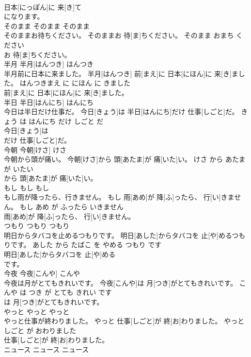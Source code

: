 \documentclass[8pt]{extreport}
\begin{document}
\begin{CJK}{UTF8}{min}
\\	日本[にっぽん]に 来[き]て
\\	になります。			
\\	そのまま	そのまま	そのまま	
\\	そのままお待ちください。	そのままお 待[ま]ちください。	そのまま おまち ください	
\\	お 待[ま]ちください。			
\\	半月	半月[はんつき]	はんつき	
\\	半月前に日本に来ました。	半月[はんつき] 前[まえ]に 日本[にほん]に 来[き]ました。	はんつきまえ に にほん に きました	
\\	前[まえ]に 日本[にほん]に 来[き]ました。			
\\	半日	半日[はんにち]	はんにち	
\\	今日は半日だけ仕事だ。	今日[きょう]は 半日[はんにち]だけ 仕事[しごと]だ。	きょう は はんにち だけ しごと だ	
\\	今日[きょう]は
\\	だけ 仕事[しごと]だ。			
\\	今朝	今朝[けさ]	けさ	
\\	今朝から頭が痛い。	今朝[けさ]から 頭[あたま]が 痛[いた]い。	けさ から あたま が いたい	
\\	から 頭[あたま]が 痛[いた]い。			
\\	もし	もし	もし	
\\	もし雨が降ったら、行きません。	もし 雨[あめ]が 降[ふ]ったら、 行[い]きません。	もし あめ が ふったら いきません	
\\	雨[あめ]が 降[ふ]ったら、 行[い]きません。			
\\	つもり	つもり	つもり	
\\	明日からタバコを止めるつもりです。	明日[あした]からタバコを 止[や]めるつもりです。	あした から たばこ を やめる つもり です	
\\	明日[あした]からタバコを 止[や]める
\\	です。			
\\	今夜	今夜[こんや]	こんや	
\\	今夜は月がとてもきれいです。	今夜[こんや]は 月[つき]がとてもきれいです。	こんや は つき が とても きれい です	
\\	は 月[つき]がとてもきれいです。			
\\	やっと	やっと	やっと	
\\	やっと仕事が終わりました。	やっと 仕事[しごと]が 終[お]わりました。	やっと しごと が おわりました	
\\	仕事[しごと]が 終[お]わりました。			
\\	ニュース	ニュース	ニュース	

\end{CJK}
\end{document}
